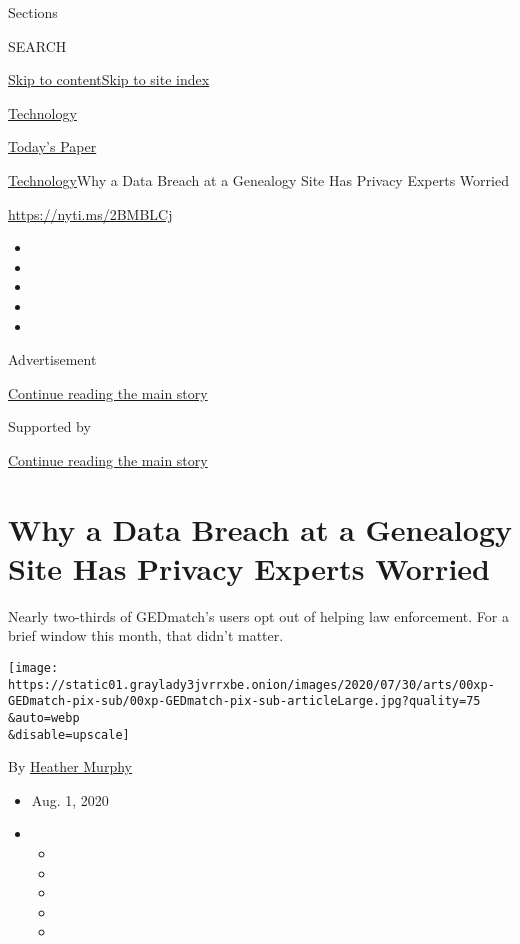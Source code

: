 Sections

SEARCH

\protect\hyperlink{site-content}{Skip to
content}\protect\hyperlink{site-index}{Skip to site index}

\href{https://www.nytimes3xbfgragh.onion/section/technology}{Technology}

\href{https://myaccount.nytimes3xbfgragh.onion/auth/login?response_type=cookie\&client_id=vi}{}

\href{https://www.nytimes3xbfgragh.onion/section/todayspaper}{Today's
Paper}

\href{/section/technology}{Technology}\textbar{}Why a Data Breach at a
Genealogy Site Has Privacy Experts Worried

\url{https://nyti.ms/2BMBLCj}

\begin{itemize}
\item
\item
\item
\item
\item
\end{itemize}

Advertisement

\protect\hyperlink{after-top}{Continue reading the main story}

Supported by

\protect\hyperlink{after-sponsor}{Continue reading the main story}

\hypertarget{why-a-data-breach-at-a-genealogy-site-has-privacy-experts-worried}{%
\section{Why a Data Breach at a Genealogy Site Has Privacy Experts
Worried}\label{why-a-data-breach-at-a-genealogy-site-has-privacy-experts-worried}}

Nearly two-thirds of GEDmatch's users opt out of helping law
enforcement. For a brief window this month, that didn't matter.

\texttt{[image: https://static01.graylady3jvrrxbe.onion/images/2020/07/30/arts/00xp-GEDmatch-pix-sub/00xp-GEDmatch-pix-sub-articleLarge.jpg?quality=75\\\&auto=webp\\\&disable=upscale]}

By \href{https://www.nytimes3xbfgragh.onion/by/heather-murphy}{Heather
Murphy}

\begin{itemize}
\item
  Aug. 1, 2020
\item
  \begin{itemize}
  \item
  \item
  \item
  \item
  \item
  \end{itemize}
\end{itemize}

